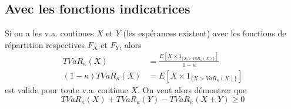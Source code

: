 \subsection{Avec les fonctions indicatrices}
Si on a les v.a. continues $X$ et $Y$ (les espérances existent) avec les fonctions de répartition respectives $F_X$ et $F_Y$, alors
\begin{align*}
TVaR_\kappa(X) & = \frac{E[ X \times 1_{\{X > VaR_\kappa(X) \}} ]}{1 - \kappa}  \\
(1 - \kappa) TVaR_\kappa(X) & = E[ X \times 1_{\{X > VaR_\kappa(X) \}} ]
\end{align*}
est valide pour toute v.a. continue $X$.
\p
On veut alors démontrer que
\begin{equation}
\label{eq:subaddit_tvar}
TVaR_\kappa(X) + TVaR_\kappa(Y) - TVaR_\kappa(X + Y) \ge 0
\end{equation}

